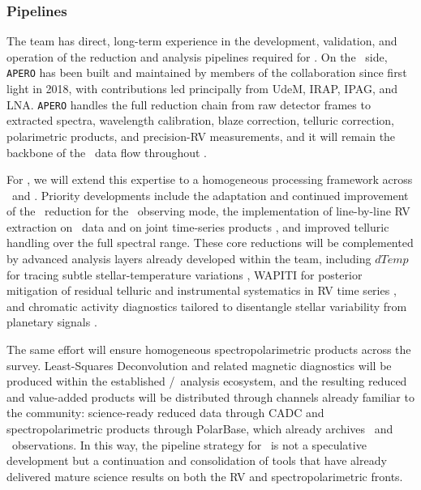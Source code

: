 \subsubsection{Pipelines}


The team has direct, long-term experience in the development, validation, and operation of the reduction and analysis pipelines required for \wena. On the \spi\ side, \texttt{APERO} \citep{cook_apero_2022} has been built and maintained by members of the collaboration since first light in 2018, with contributions led principally from UdeM, IRAP, IPAG, and LNA. \texttt{APERO} handles the full reduction chain from raw detector frames to extracted spectra, wavelength calibration, blaze correction, telluric correction, polarimetric products, and precision-RV measurements, and it will remain the backbone of the \spi\ data flow throughout \amakihi.

For \wena, we will extend this expertise to a homogeneous processing framework across \spi\ and \esp. Priority developments include the adaptation and continued improvement of the \esp\ reduction for the \wena\ observing mode, the implementation of line-by-line RV extraction on \esp\ data and on joint time-series products \citep{artigau_line-by-line_2022}, and improved telluric handling over the full spectral range. These core reductions will be complemented by advanced analysis layers already developed within the team, including $dTemp$ for tracing subtle stellar-temperature variations \citep{artigau_measuring_2024}, WAPITI for posterior mitigation of residual telluric and instrumental systematics in RV time series \citep{ould-elhkim_wapiti_2023}, and chromatic activity diagnostics tailored to disentangle stellar variability from planetary signals \citep{larue2025}.

The same effort will ensure homogeneous spectropolarimetric products across the survey. Least-Squares Deconvolution and related magnetic diagnostics will be produced within the established \esp/\spi\ analysis ecosystem, and the resulting reduced and value-added products will be distributed through channels already familiar to the community: science-ready reduced data through CADC and spectropolarimetric products through PolarBase, which already archives \esp\ and \spi\ observations. In this way, the pipeline strategy for \amakihi\ is not a speculative development but a continuation and consolidation of tools that have already delivered mature science results on both the RV and spectropolarimetric fronts.